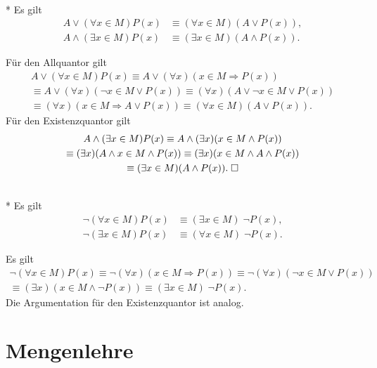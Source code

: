 \begin{Satz}\mbox{}\\*
Es gilt
\begin{align*}
A\lor (\forall x\in M)P(x) &\equiv (\forall x\in M)(A\lor P(x)),\\
A\land(\exists x\in M)P(x) &\equiv (\exists x\in M)(A\land P(x)).
\end{align*}
\end{Satz}
 Für den Allquantor gilt
\begin{gather}
A\lor (\forall x\in M)P(x)
\equiv A\lor(\forall x)(x\in M\Rightarrow P(x))\\
\equiv A\lor(\forall x)(\neg x\in M\lor P(x))
\equiv (\forall x)(A\lor\neg x\in M\lor P(x))\\
\equiv (\forall x)(x\in M\Rightarrow A\lor P(x))
\equiv (\forall x\in M)(A\lor P(x)).
\end{gather}
Für den Existenzquantor gilt
\begin{gather}
A\land (\exists x\in M)P(x)
\equiv A\land(\exists x)(x\in M\land P(x))\\
\equiv (\exists x)(A\land x\in M\land P(x))
\equiv (\exists x)(x\in M\land A\land P(x))\\
\equiv (\exists x\in M)(A\land P(x)).\;\Box
\end{gather}

\begin{Satz}\mbox{}\\*
Es gilt
\begin{align*}
\neg (\forall x\in M)P(x) &\equiv (\exists x\in M)\;\neg P(x),\\
\neg (\exists x\in M)P(x) &\equiv (\forall x\in M)\;\neg P(x).
\end{align*}
\end{Satz}
 Es gilt
\begin{gather}
\neg(\forall x\in M)P(x) \equiv \neg(\forall x)(x\in M\Rightarrow P(x))
\equiv \neg(\forall x)(\neg x\in M\lor P(x))\\
\equiv (\exists x)(x\in M\land \neg P(x))
\equiv (\exists x\in M)\;\neg P(x).
\end{gather}
Die Argumentation für den Existenzquantor ist analog.\;\qedsymbol

\newpage
\section{Mengenlehre}

